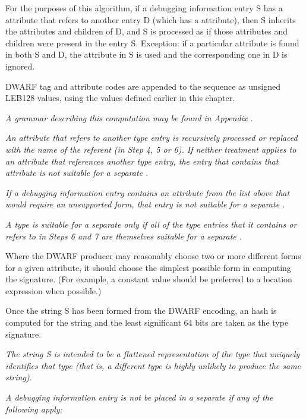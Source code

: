 For the purposes of this algorithm, if a debugging information
entry S has a 
\DWATspecification{} 
attribute that refers to
another entry D (which has a 
\DWATdeclaration{} 
attribute),
then S inherits the attributes and children of D, and S is
processed as if those attributes and children were present in
the entry S. Exception: if a particular attribute is found in
both S and D, the attribute in S is used and the corresponding
one in D is ignored.

DWARF tag and attribute codes are appended to the sequence
as unsigned LEB128 values, 
using the values defined earlier in this chapter.

\textit{A grammar describing this computation may be found in
Appendix .
}

\textit{An attribute that refers to another type entry is
recursively processed or replaced with the name of the
referent (in Step 4, 5 or 6). If neither treatment applies to
an attribute that references another type entry, the entry
that contains that attribute is not suitable for a
separate .}

\textit{If a debugging information entry contains an attribute from
the list above that would require an unsupported form, that
entry is not suitable for a separate 
.}

\textit{A type is suitable for a separate 
 only
if all of the type entries that it contains or refers to in
Steps 6 and 7 are themselves suitable for a separate
.}

Where the DWARF producer may reasonably choose two or more
different forms for a given attribute, it should choose
the simplest possible form in computing the signature. (For
example, a constant value should be preferred to a location
expression when possible.)

Once the string S has been formed from the DWARF encoding,
an \MDfive{} hash is computed for the string and the 
least significant 64 bits are taken as the type signature.

\textit{The string S is intended to be a flattened representation of
the type that uniquely identifies that type (that is, a different
type is highly unlikely to produce the same string).}

\textit{A debugging information entry is not be placed in a
separate 
if any of the following apply:}


